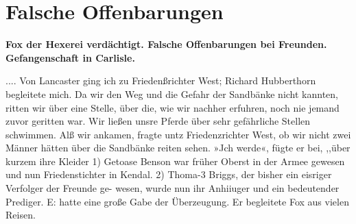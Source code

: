 
\chapter[Falsche Offenbarungen]{Falsche Offenbarungen}

\begin{center}
\textbf{Fox der Hexerei verdächtigt. Falsche Offenbarungen 
bei Freunden. Gefangenschaft in Carlisle.}
\end{center}

.... Von Lancaster ging ich zu Friedenßrichter West; Richard
Hubberthorn begleitete mich. Da wir den Weg und die Gefahr
der Sandbänke nicht kannten, ritten wir über eine Stelle, über
die, wie wir nachher erfuhren, noch nie jemand zuvor geritten
war. Wir ließen unsre Pferde über sehr gefährliche Stellen
schwimmen. Alß wir ankamen, fragte untz Friedenzrichter West,
ob wir nicht zwei Männer hätten über die Sandbänke reiten
sehen. »Jch werde«, fügte er bei, ,,über kurzem ihre Kleider
1) Getoase Benson war früher Oberst in der Armee gewesen und nun
Friedenstichter in Kendal.
2) Thoma-3 Briggs, der bisher ein eisriger Verfolger der Freunde ge-
wesen, wurde nun ihr Anhiiuger und ein bedeutender Prediger. E: hatte eine
große Gabe der Überzeugung. Er begleitete Fox aus vielen Reisen.


